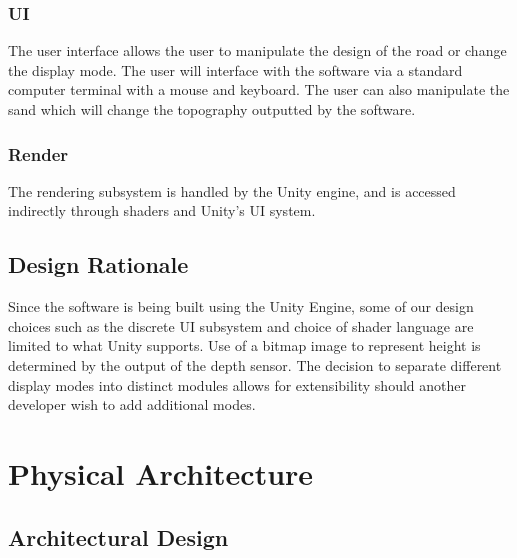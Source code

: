 \documentclass[onecolumn, draftclsnofoot,10pt, compsoc]{IEEEtran}
\begin{document}
\subsubsection{UI} %
The user interface allows the user to manipulate the design of the road or change the display mode.
The user will interface with the software via a standard computer terminal with a mouse and keyboard.
The user can also manipulate the sand which will change the topography outputted by the software.

\subsubsection{Render}  %
The rendering subsystem is handled by the Unity engine, and is accessed indirectly through shaders and Unity's UI system.

\subsection{Design Rationale}
Since the software is being built using the Unity Engine, some of our design choices such as the discrete UI subsystem and choice of shader language are limited to what Unity supports. Use of a bitmap image to represent height is determined by the output of the depth sensor. 
The decision to separate different display modes into distinct modules allows for extensibility should another developer wish to add additional modes.

\section{Physical Architecture} %


\subsection{Architectural Design}
\end{document}
